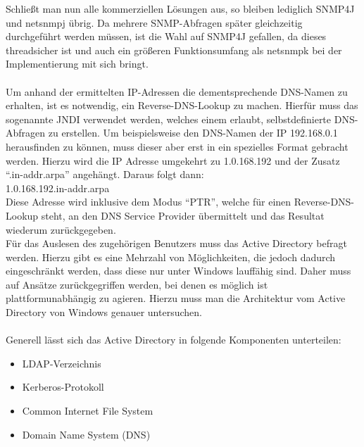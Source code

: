 Schließt man nun alle kommerziellen Lösungen aus, so bleiben lediglich SNMP4J und netsnmpj übrig.
Da mehrere SNMP-Abfragen später gleichzeitig durchgeführt werden müssen, ist die Wahl auf SNMP4J gefallen, da dieses threadsicher ist und auch ein größeren Funktionsumfang als netsnmpk bei der Implementierung mit sich bringt.\\\\
Um anhand der ermittelten IP-Adressen die dementsprechende DNS-Namen zu erhalten, ist es notwendig, ein Reverse-DNS-Lookup zu machen.
Hierfür muss das sogenannte JNDI verwendet werden, welches einem erlaubt, selbstdefinierte DNS-Abfragen zu erstellen.
Um beispielsweise den DNS-Namen der IP 192.168.0.1 herausfinden zu können, muss dieser aber erst in ein spezielles Format gebracht werden. Hierzu wird die IP Adresse umgekehrt zu 1.0.168.192 und der Zusatz “.in-addr.arpa” angehängt. Daraus folgt dann:\\

1.0.168.192.in-addr.arpa\\

Diese Adresse wird inklusive dem Modus “PTR”, welche für einen Reverse-DNS-Lookup steht, an den DNS Service Provider übermittelt und das Resultat wiederum zurückgegeben.\\

Für das Auslesen des zugehörigen Benutzers muss das Active Directory befragt werden.
Hierzu gibt es eine Mehrzahl von Möglichkeiten, die jedoch dadurch eingeschränkt werden, dass diese nur unter Windows lauffähig sind. Daher muss auf Ansätze zurückgegriffen werden, bei denen es möglich ist plattformunabhängig zu agieren. Hierzu muss man die Architektur vom Active Directory von Windows genauer untersuchen.\\\\
Generell lässt sich das Active Directory in folgende Komponenten unterteilen:
\begin{itemize}
\item LDAP-Verzeichnis
\item Kerberos-Protokoll
\item Common Internet File System
\item Domain Name System (DNS)\\
\end{itemize}

